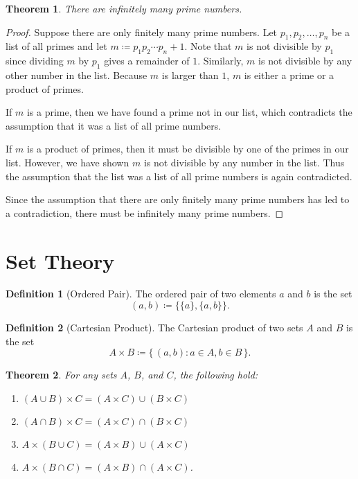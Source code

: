 \documentclass[headings=standardclasses]{scrartcl}
\newtheorem{theorem}{Theorem}
\theoremstyle{definition}
\newtheorem{definition}{Definition}
\begin{document}
\begin{theorem}
  There are infinitely many prime numbers.
\end{theorem}

\begin{proof}
  Suppose there are only finitely many prime numbers. Let \(p_1, p_2, \ldots,
  p_n\) be a list of all primes and let \(m ≔ p_{1}p_{2} \cdots p_n + 1\). Note
  that \(m\) is not divisible by \(p_1\) since dividing \(m\) by \(p_1\) gives
  a remainder of \(1\). Similarly, \(m\) is not divisible by any other number
  in the list. Because \(m\) is larger than \(1\), \(m\) is either a prime or a
  product of primes.

  If \(m\) is a prime, then we have found a prime not in our list, which
  contradicts the assumption that it was a list of all prime numbers.

  If \(m\) is a product of primes, then it must be divisible by one of the
  primes in our list. However, we have shown \(m\) is not divisible by any
  number in the list. Thus the assumption that the list was a list of all prime
  numbers is again contradicted.

  Since the assumption that there are only finitely many prime numbers has led
  to a contradiction, there must be infinitely many prime numbers.
\end{proof}

\section*{Set Theory}

\begin{definition}[Ordered Pair]\label{def:ordered_pair}
  The ordered pair of two elements \(a\) and \(b\) is the set
  \[ (a, b) ≔ \{\{a\}, \{a, b\}\}. \]
\end{definition}

\begin{definition}[Cartesian Product]\label{def:cartesian_product}
  The Cartesian product of two sets \(A\) and \(B\) is the set
  \[ A × B ≔ \{\, (a, b) : a ∈ A, b ∈ B \,\}. \]
\end{definition}

\begin{theorem}
  For any sets \(A\), \(B\), and \(C\), the following hold:
  \begin{enumerate}[label=(\alph*)]
    \item \((A ∪ B) × C = (A × C) ∪ (B × C)\)
    \item \((A ∩ B) × C = (A × C) ∩ (B × C)\)
    \item \(A × (B ∪ C) = (A × B) ∪ (A × C)\)
    \item \(A × (B ∩ C) = (A × B) ∩ (A × C)\).
  \end{enumerate}
\end{theorem}
\end{document}
